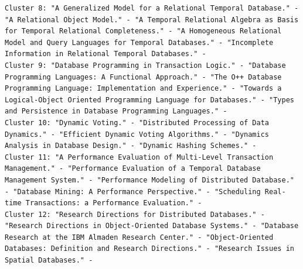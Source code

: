\documentclass[a4paper,fontsize=11pt]{article}
\begin{document}
\begin{lstlisting}[caption={KMeans output},label={lst:output},breaklines]
Cluster 8: "A Generalized Model for a Relational Temporal Database." - "A Relational Object Model." - "A Temporal Relational Algebra as Basis for Temporal Relational Completeness." - "A Homogeneous Relational Model and Query Languages for Temporal Databases." - "Incomplete Information in Relational Temporal Databases." - 
Cluster 9: "Database Programming in Transaction Logic." - "Database Programming Languages: A Functional Approach." - "The O++ Database Programming Language: Implementation and Experience." - "Towards a Logical-Object Oriented Programming Language for Databases." - "Types and Persistence in Database Programming Languages." - 
Cluster 10: "Dynamic Voting." - "Distributed Processing of Data Dynamics." - "Efficient Dynamic Voting Algorithms." - "Dynamics Analysis in Database Design." - "Dynamic Hashing Schemes." - 
Cluster 11: "A Performance Evaluation of Multi-Level Transaction Management." - "Performance Evaluation of a Temporal Database Management System." - "Performance Modeling of Distributed Database." - "Database Mining: A Performance Perspective." - "Scheduling Real-time Transactions: a Performance Evaluation." - 
Cluster 12: "Research Directions for Distributed Databases." - "Research Directions in Object-Oriented Database Systems." - "Database Research at the IBM Almaden Research Center." - "Object-Oriented Databases: Definition and Research Directions." - "Research Issues in Spatial Databases." - 



\end{lstlisting}
\end{document}
